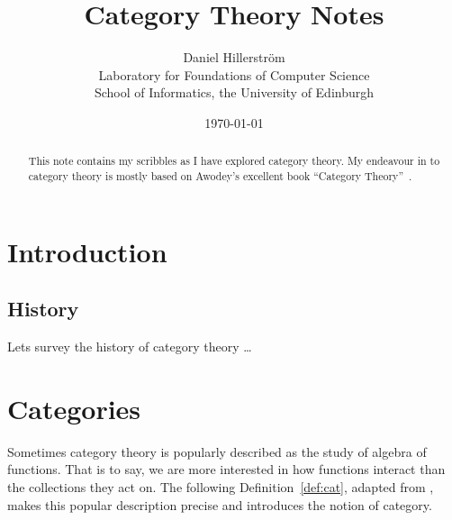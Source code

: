 \documentclass[10pt,twoside,a4paper]{article}
\author{Daniel Hillerström\\\small{Laboratory for Foundations of Computer Science}\\\small{School of Informatics, the University of Edinburgh}}
\title{\bfseries Category Theory Notes}
\date{\today}
\theoremstyle{plain}
\theoremstyle{definition}
\begin{document}
\maketitle
\begin{abstract}
  This note contains my scribbles as I have explored category theory.
  My endeavour in to category theory is mostly based on Awodey's
  excellent book ``Category Theory''~\cite{Awodey11}.
\end{abstract}

%
%
\tableofcontents

%
%
\section{Introduction}
\label{sec:intro}
\subsection{History}
Lets survey the history of category theory \dots

%
%
\section{Categories}
\label{sec:cats}

Sometimes category theory is popularly described as the study of
algebra of functions. That is to say, we are more interested in how
functions interact than the collections they act on. The following
Definition~\ref{def:cat}, adapted from \citet{Awodey11}, makes this
popular description precise and introduces the notion of category.
\end{document}
